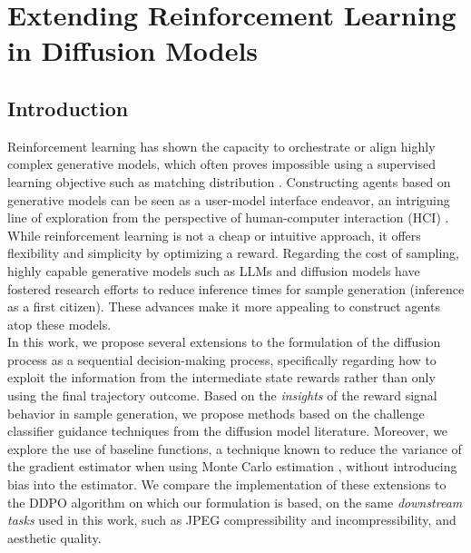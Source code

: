 \chapter{Extending Reinforcement Learning in Diffusion Models}

\section{Introduction}


Reinforcement learning has shown the capacity to orchestrate or align highly complex generative models, which often proves impossible using a supervised learning objective such as matching distribution .  Constructing agents based on generative models can be seen as a user-model interface endeavor, an intriguing line of exploration from the perspective of human-computer interaction (HCI) . While reinforcement learning is not a cheap or intuitive approach, it offers flexibility and simplicity by optimizing a reward. Regarding the cost of sampling, highly capable generative models such as LLMs and diffusion models have fostered research efforts to reduce inference times for sample generation (inference as a first citizen). These advances make it more appealing to construct agents atop these models. \\

\noindent In this work, we propose several extensions to the formulation of the diffusion process as a sequential decision-making process, specifically regarding how to exploit the information from the intermediate state rewards rather than only using the final trajectory outcome. Based on the \textit{insights} of the reward signal behavior in sample generation, we propose methods based on the challenge classifier guidance techniques from the diffusion model literature. Moreover, we explore the use of baseline functions, a technique known to reduce the variance of the gradient estimator when using Monte Carlo estimation \cite{mohamed2020monte}, without introducing bias into the estimator. We compare the implementation of these extensions to the DDPO algorithm \cite{black2023training} on which our formulation is based, on the same \textit{downstream tasks} used in this work, such as JPEG compressibility and incompressibility, and aesthetic quality. \\

